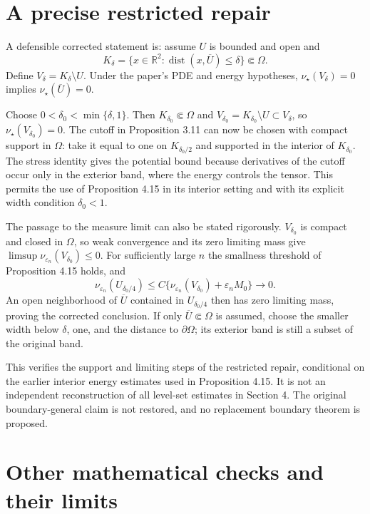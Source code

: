 \documentclass[10pt]{article}
\begin{document}
\section*{A precise restricted repair}
A defensible corrected statement is: assume \(U\) is bounded and open and \[K_\delta=\{x\in\mathbb R^2:\operatorname{dist}(x,\overline U)\le\delta\}
 \Subset\Omega .\] Define \(V_\delta=K_\delta\setminus U\). Under the paper’s PDE and energy hypotheses, \(\nu_\star(V_\delta)=0\) implies \(\nu_\star(\overline U)=0\).\par
Choose \(0<\delta_0<\min\{\delta,1\}\). Then \(K_{\delta_0}\Subset\Omega\) and \(V_{\delta_0}=K_{\delta_0}\setminus U\subset V_\delta\), so \(\nu_\star(V_{\delta_0})=0\). The cutoff in Proposition 3.11 can now be chosen with compact support in \(\Omega\): take it equal to one on \(K_{\delta_0/2}\) and supported in the interior of \(K_{\delta_0}\). The stress identity gives the potential bound because derivatives of the cutoff occur only in the exterior band, where the energy controls the tensor. This permits the use of Proposition 4.15 in its interior setting and with its explicit width condition \(\delta_0<1\).\par
The passage to the measure limit can also be stated rigorously. \(V_{\delta_0}\) is compact and closed in \(\Omega\), so weak convergence and its zero limiting mass give \(\limsup\nu_{\varepsilon_n}(V_{\delta_0})\le0\). For sufficiently large \(n\) the smallness threshold of Proposition 4.15 holds, and \[\nu_{\varepsilon_n}(U_{\delta_0/4})
 \le C\{\nu_{\varepsilon_n}(V_{\delta_0})+\varepsilon_nM_0\}\longrightarrow0.\] An open neighborhood of \(\overline U\) contained in \(U_{\delta_0/4}\) then has zero limiting mass, proving the corrected conclusion. If only \(\overline U\Subset\Omega\) is assumed, choose the smaller width below \(\delta\), one, and the distance to \(\partial\Omega\); its exterior band is still a subset of the original band.\par
This verifies the support and limiting steps of the restricted repair, conditional on the earlier interior energy estimates used in Proposition 4.15. It is not an independent reconstruction of all level-set estimates in Section 4. The original boundary-general claim is not restored, and no replacement boundary theorem is proposed.\par
\section*{Other mathematical checks and their limits}
\end{document}
